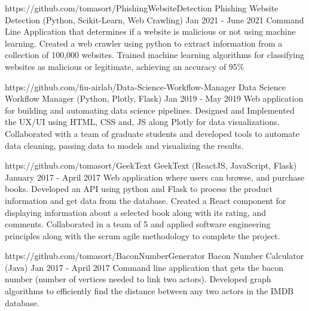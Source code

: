 \documentclass[letterpaper,10pt]{article}
\begin{document}
  \projectHeading
    {https://github.com/tomasort/PhishingWebsiteDetection}
    {Phishing Website Detection}
    {(Python, Scikit-Learn, Web Crawling)}
    {Jan 2021 - June 2021}
    {Command Line Application that determines if a website is malicious or not using machine learning.}
  \listStart
    \bulletItem
      {Created a web crawler using python to extract information from a collection of 100,000 websites. }
    \bulletItem
      {Trained machine learning algorithms for classifying websites as malicious or legitimate, achieving an accuracy of 95\%}
  \listEnd

  \projectHeading
    {https://github.com/fiu-airlab/Data-Science-Workflow-Manager}
    {Data Science Workflow Manager}
    {(Python, Plotly, Flask)}
    {Jan 2019 - May 2019}
    {Web application for building and automating data science pipelines.}
  \listStart
    \bulletItem
      {Designed and Implemented the UX/UI using HTML, CSS and, JS along Plotly for data visualizations. }
    \bulletItem
      {Collaborated with a team of graduate students and developed tools to automate data cleaning, passing data to models and visualizing the results.}
  \listEnd

  \projectHeading
    {https://github.com/tomasort/GeekText}
    {GeekText}
    {(ReactJS, JavaScript, Flask)}
    {January 2017 - April 2017}
    {Web application where users can browse, and purchase books.}
  \listStart
    \bulletItem
      {Developed an API using python and Flask to process the product information and get data from the database. }
    \bulletItem
      {Created a React component for displaying information about a selected book along with its rating, and comments. }
    \bulletItem
      {Collaborated in a team of 5 and applied software engineering principles along with the scrum agile methodology to complete the project. }
  \listEnd

  \projectHeading
    {https://github.com/tomasort/BaconNumberGenerator}
    {Bacon Number Calculator}
    {(Java)}
    {Jan 2017 - April 2017}
    {Command line application that gets the bacon number (number of vertices needed to link two actors).}
  \listStart
    \bulletItem
      {Developed graph algorithms to efficiently find the distance between any two actors in the IMDB database. }
  \listEnd

\sectionEnd
  
\end{document}
